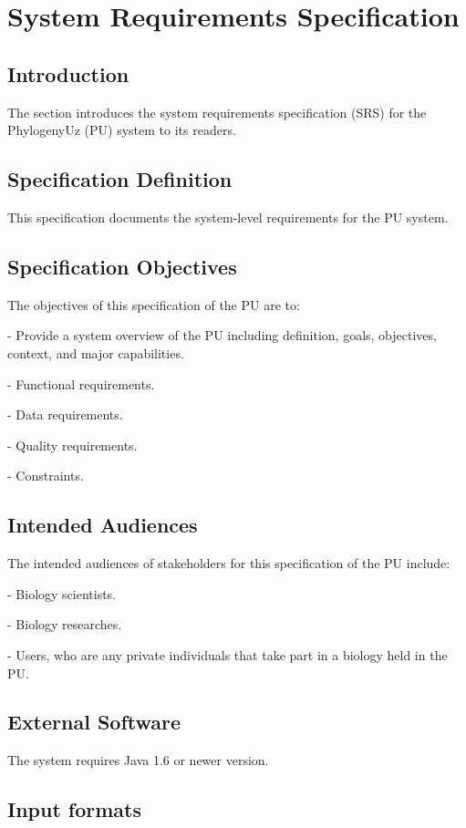 \section{System Requirements Specification}

\subsection{Introduction}
The section introduces the system requirements specification (SRS) 
for the PhylogenyUz (PU) system to its readers.

\subsection{Specification Definition}
This specification documents the system-level 
requirements for the PU system.

\subsection{Specification Objectives}
The objectives of this specification of the PU are to:

- Provide a system overview of the PU including definition, 
goals, objectives, context, and major capabilities.

- Functional requirements.

- Data requirements.

- Quality requirements.

- Constraints.

\subsection{Intended Audiences}

The intended audiences of stakeholders for this 
specification of the PU include:

- Biology scientists.

- Biology researches.

- Users, who are any private individuals that take part in a biology held in the PU.

\subsection{External Software}

The system requires Java 1.6 or newer version.

\subsection{Input formats}

